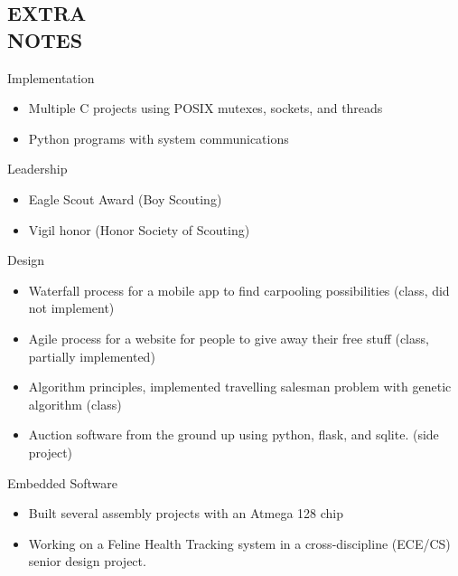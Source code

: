 \documentclass[mm]{res}
\begin{document}
\begin{resume}
\section{EXTRA \\ NOTES}     
	Implementation
		\begin{itemize}
			\item Multiple C projects using POSIX mutexes, sockets, and threads
			\item Python programs with system communications
		\end{itemize}    
            Leadership
		\begin{itemize}
			\item Eagle Scout Award (Boy Scouting)
			\item Vigil honor (Honor Society of Scouting)
		\end{itemize}
	Design
		\begin{itemize}
			\item Waterfall process for a mobile app to find carpooling possibilities (class, did not implement)
			\item Agile process for a website for people to give away their free stuff (class, partially implemented)
			\item Algorithm principles, implemented travelling salesman problem with genetic algorithm (class)
      \item Auction software from the ground up using python, flask, and sqlite. (side project)
		\end{itemize}
	Embedded Software
		\begin{itemize}
			\item Built several assembly projects with an Atmega 128 chip
      \item Working on a Feline Health Tracking system in a cross-discipline (ECE/CS) senior design project.
 		\end{itemize}

\end{resume}
\end{document}
